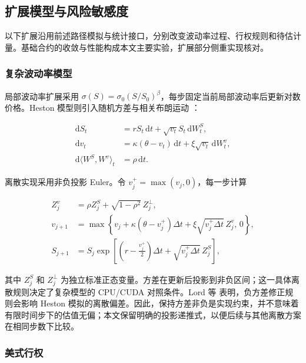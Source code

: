 \documentclass[UTF8,a4paper,zihao=5,fontset=none]{ctexart}
\begin{document}
\subsection{扩展模型与风险敏感度}

以下扩展沿用前述路径模拟与统计接口，分别改变波动率过程、行权规则和待估计量。基础合约的收敛与性能构成本文主要实验，扩展部分侧重实现核对。


\subsubsection{复杂波动率模型}

局部波动率扩展采用 $\sigma(S)=\sigma_0(S/S_0)^\beta$，每步固定当前局部波动率后更新对数价格。Heston 模型则引入随机方差与相关布朗运动 \cite{r4}：


\nopagebreak[4]
\begin{equation}
\label{eq:8}
\begin{aligned}
\mathrm dS_t&=rS_t\,\mathrm dt+\sqrt{v_t}S_t\,\mathrm dW_t^S,\\
\mathrm dv_t&=\kappa(\theta-v_t)\,\mathrm dt
+\xi\sqrt{v_t}\,\mathrm dW_t^v,\\
\mathrm d\langle W^S,W^v\rangle_t&=\rho\,\mathrm dt.
\end{aligned}
\end{equation}

离散实现采用非负投影 Euler。令 $v_j^+=\max(v_j,0)$，每一步计算


\nopagebreak[4]
\begin{equation}
\label{eq:9}
\begin{aligned}
Z_j^v&=\rho Z_j^S+\sqrt{1-\rho^2}\,Z_j^{\perp},\\
v_{j+1}&=\max\!\left\{v_j+\kappa(\theta-v_j^+)\Delta t
+\xi\sqrt{v_j^+\Delta t}\,Z_j^v,\,0\right\},\\
S_{j+1}&=S_j\exp\!\left[
\left(r-\frac{v_j^+}{2}\right)\Delta t
+\sqrt{v_j^+\Delta t}\,Z_j^S\right],
\end{aligned}
\end{equation}

其中 $Z_j^S$ 和 $Z_j^{\perp}$ 为独立标准正态变量。方差在更新后投影到非负区间；这一具体离散规则决定了复杂模型的 CPU/CUDA 对照条件。Lord 等 \cite{r11} 表明，负方差修正规则会影响 Heston 模拟的离散偏差。因此，保持方差非负是实现约束，并不意味着有限时间步下的估值无偏；本文保留明确的投影递推式，以便后续与其他离散方案在相同步数下比较。


\subsubsection{美式行权}
\end{document}

